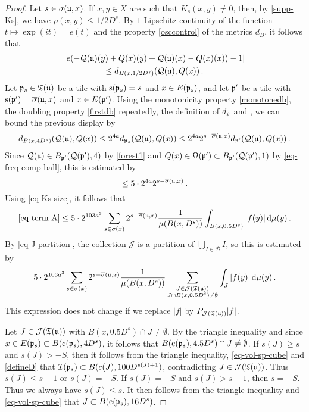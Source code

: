 \begin{proof}
    \leanok
    Let $s \in \sigma({\mathfrak u},x)$.
    If $x, y \in X$ are such that $K_s(x,y)\neq 0$, then, by \eqref{supp-Ks}, we have $\rho(x,y)\leq 1/2 D^s$. By $1$-Lipschitz continuity of the function $t \mapsto \exp(it) = e(t)$ and the property \eqref{osccontrol} of the metrics $d_B$, it follows that
    \begin{multline*}
        |e(-{\mathcal{Q}}({\mathfrak u})(y)+{Q}(x)(y)+{\mathcal{Q}}({\mathfrak u})(x)-{Q}(x)(x))-1|\\
        \leq d_{B(x, 1/2 D^{s})}({\mathcal{Q}}({\mathfrak u}), {Q}(x))\,.
    \end{multline*}
    Let ${\mathfrak p}_s \in {\mathfrak T}({\mathfrak u})$ be a tile with ${\mathrm{s}}({\mathfrak p}_s) = s$ and $x \in E({\mathfrak p}_s)$, and let ${\mathfrak p}'$ be a tile with ${\mathrm{s}}({\mathfrak p}') = \overline{\sigma}({\mathfrak u}, x)$ and $x \in E({\mathfrak p}')$.
    Using the monotonicity property \eqref{monotonedb}, the doubling property \eqref{firstdb} repeatedly, the definition of $d_{{\mathfrak p}}$ and , we can bound the previous display by
    $$
        d_{B(x, 4 D^{s})}({\mathcal{Q}}({\mathfrak u}), {Q}(x)) \leq 2^{4a} d_{{\mathfrak p}_s}({\mathcal{Q}}({\mathfrak u}), {Q}(x)) \le 2^{4a} 2^{s - \overline{\sigma}({\mathfrak u}, x)} d_{{\mathfrak p}'}({\mathcal{Q}}({\mathfrak u}), {Q}(x))\,.
    $$
    Since ${\mathcal{Q}}({\mathfrak u}) \in B_{{\mathfrak p}'}({\mathcal{Q}}({\mathfrak p}'), 4)$ by \eqref{forest1} and ${Q}(x) \in \Omega({\mathfrak p}') \subset B_{{\mathfrak p}'}({\mathcal{Q}}({\mathfrak p}'), 1)$ by \eqref{eq-freq-comp-ball}, this is estimated by
    $$
        \le 5 \cdot 2^{4a} 2^{s - \overline{\sigma}({\mathfrak u}, x)} \,.
    $$
    Using \eqref{eq-Ks-size}, it follows that
    $$
        \eqref{eq-term-A} \le 5\cdot 2^{103a^3} \sum_{s\in\sigma(x)}2^{s - \overline{\sigma}({\mathfrak u}, x)} \frac{1}{\mu(B(x,D^s))}\int_{B(x,0.5D^{s})}|f(y)|\,\mathrm{d}\mu(y)\,.
    $$
    By \eqref{eq-J-partition}, the collection $\mathcal{J}$ is a partition of $\bigcup_{I \in \mathcal{D}} I$, so this is estimated by
    $$
         5\cdot 2^{103a^3} \sum_{s\in\sigma(x)}2^{s - \overline{\sigma}({\mathfrak u}, x)} \frac{1}{\mu(B(x,D^s))}\sum_{\substack{J \in \mathcal{J}({\mathfrak T}({\mathfrak u}))\\J \cap B(x, 0.5D^s) \ne \emptyset} }\int_{J}|f(y)|\,\mathrm{d}\mu(y)\,.
    $$
    This expression does not change if we replace $|f|$ by $P_{\mathcal{J}({\mathfrak T}({\mathfrak u}))}|f|$.

    Let $J \in \mathcal{J}({\mathfrak T}({\mathfrak u}))$ with $B(x, 0.5 D^s) \cap J \ne \emptyset$. By the triangle inequality and since $x \in E({\mathfrak p}_s) \subset B({\mathrm{c}}({\mathfrak p}_s), 4D^{s})$, it follows that $B({\mathrm{c}}({\mathfrak p}_s), 4.5D^s) \cap J \ne \emptyset$. If $s(J) \ge s$ and $s(J) > -S$, then it follows from the triangle inequality, \eqref{eq-vol-sp-cube} and \eqref{defineD} that ${\mathcal{I}}({\mathfrak p}_s) \subset B(c(J), 100 D^{s(J)+1})$, contradicting $J \in \mathcal{J}(\mathfrak{T}({\mathfrak u}))$. Thus $s(J) \le s - 1$ or $s(J) = -S$. If $s(J) = -S$ and $s(J) > s - 1$, then $s = -S$. Thus we always have $s(J) \le s$. It then follows from the triangle inequality and \eqref{eq-vol-sp-cube} that $J \subset B({\mathrm{c}}({\mathfrak p}_s), 16 D^s)$.


\end{proof}
